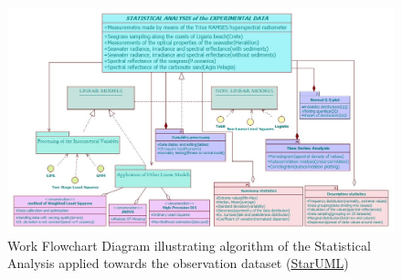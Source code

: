 \documentclass[10pt, a4paper]{article}
\begin{document}
\begin{figure}[H]
	\centering
	\includegraphics[scale=0.43, angle=90]{UML_StatAn.jpg}
	\caption{Work Flowchart Diagram illustrating algorithm of the Statistical Analysis applied towards the observation dataset (\href{http://staruml.sourceforge.net/en/}{StarUML})}
	\label{fig:4.12}
\end{figure}
\pagebreak
\end{document}
